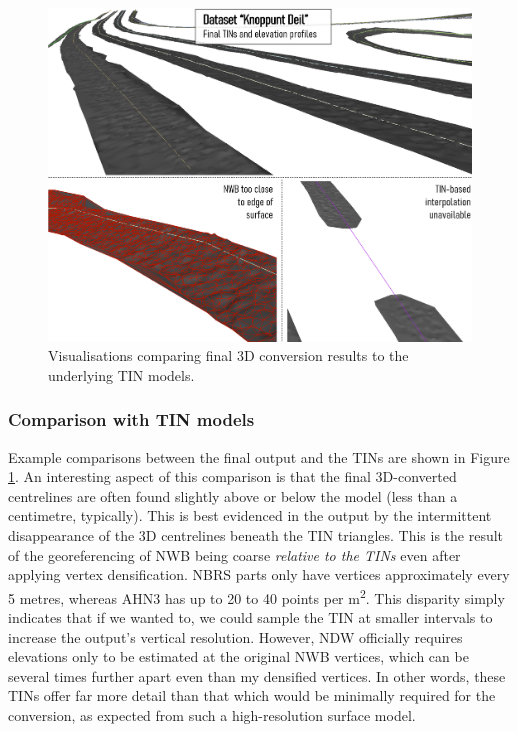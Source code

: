 \begin{figure}
    \centering
    \includegraphics[width=0.9\linewidth]{final_report/figs/elevationinterpolation1.png}
    \caption{Visualisations comparing final 3D conversion results to the underlying TIN models.}
    \label{fig:elevationinterpolation1}
\end{figure}

\subsubsection{Comparison with TIN models}

Example comparisons between the final output and the TINs are shown in Figure \ref{fig:elevationinterpolation1}. An interesting aspect of this comparison is that the final 3D-converted centrelines are often found slightly above or below the model (less than a centimetre, typically). This is best evidenced in the output by the intermittent disappearance of the 3D centrelines beneath the TIN triangles. This is the result of the georeferencing of NWB being coarse \textit{relative to the TINs} even after applying vertex densification. NBRS parts only have vertices approximately every 5 metres, whereas AHN3 has up to 20 to 40 points per m\textsuperscript{2}. This disparity simply indicates that if we wanted to, we could sample the TIN at smaller intervals to increase the output's vertical resolution. However, NDW officially requires elevations only to be estimated at the original NWB vertices, which can be several times further apart even than my densified vertices. In other words, these TINs offer far more detail than that which would be minimally required for the conversion, as expected from such a high-resolution surface model.

